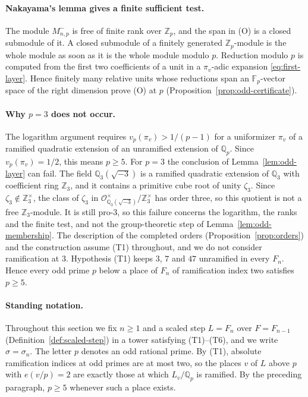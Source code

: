 \documentclass[11pt]{article}
\theoremstyle{plain}
\theoremstyle{definition}
\theoremstyle{remark}
\newcommand{\Z}{\mathbb Z}
\newcommand{\Q}{\mathbb Q}
\newcommand{\F}{\mathbb F}
\newcommand{\OO}{\mathcal O}
\begin{document}
\paragraph{Nakayama's lemma gives a finite sufficient test.}  The module
$M^-_{n,p}$ is free of finite rank over $\Z_p$, and the span in (O) is a
closed submodule of it.  A closed submodule of a finitely generated
$\Z_p$-module is the whole module as soon as it is the whole module
modulo $p$.  Reduction modulo $p$ is computed from the first two
coefficients of a unit in a $\pi_v$-adic expansion \eqref{eq:first-layer}.
Hence finitely many relative units whose reductions span an
$\F_p$-vector space of the right dimension prove (O) at $p$
(Proposition~\ref{prop:odd-certificate}).

\paragraph{Why $p=3$ does not occur.}  The logarithm argument requires
$v_p(\pi_v)>1/(p-1)$ for a uniformizer $\pi_v$ of a ramified quadratic
extension of an unramified extension of $\Q_p$.  Since $v_p(\pi_v)=1/2$,
this means $p\ge5$.  For $p=3$ the conclusion of
Lemma~\ref{lem:odd-layer} can fail.  The field $\Q_3(\sqrt{-3})$ is a
ramified quadratic extension of $\Q_3$ with coefficient ring $\Z_3$, and
it contains a primitive cube root of unity $\zeta_3$.  Since
$\zeta_3\notin\Z_3^\times$, the class of $\zeta_3$ in
$\OO_{\Q_3(\sqrt{-3})}^\times/\Z_3^\times$ has order three, so this
quotient is not a free $\Z_3$-module.  It is still pro-$3$, so this
failure concerns the logarithm, the ranks and the finite test, and not
the group-theoretic step of Lemma~\ref{lem:odd-membership}.  The
description of the completed orders (Proposition~\ref{prop:orders}) and
the construction assume \textup{(T1)} throughout, and we do not consider
ramification at $3$.  Hypothesis \textup{(T1)} keeps $3$, $7$ and $47$ unramified in
every $F_n$.  Hence every odd prime $p$ below a place of $F_n$ of
ramification index two satisfies $p\ge5$.

\paragraph{Standing notation.}  Throughout this section we fix $n\ge1$
and a scaled step $L=F_n$ over $F=F_{n-1}$
(Definition~\ref{def:scaled-step}) in a tower satisfying
\textup{(T1)--(T6)}, and we write $\sigma=\sigma_n$.  The letter $p$
denotes an odd rational prime.  By \textup{(T1)}, absolute ramification
indices at odd primes are at most two, so the places $v$ of $L$ above $p$
with $e(v/p)=2$ are exactly those at which $L_v/\Q_p$ is ramified.  By the preceding
paragraph, $p\ge5$ whenever such a place exists.
\end{document}

